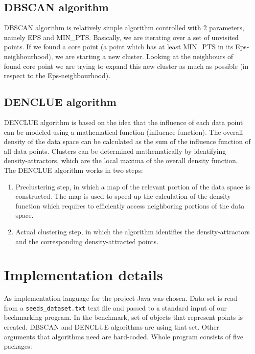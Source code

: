 \documentclass[12pt, a4paper, notitlepage, oneside]{article}
\begin{document}
\subsection{DBSCAN algorithm}

DBSCAN algorithm is relatively simple algorithm controlled with 2 parameters, namely EPS and MIN\_PTS. \cite{dbscan}
Basically, we are iterating over a set of unvisited points. If we found a core point (a point which has
at least MIN\_PTS in its Eps-neighbourhood), we are starting a new cluster. Looking at the neighbours 
of found core point we are trying to expand this new cluster as much as possible (in respect to the Eps-neighbourhood).

\subsection{DENCLUE algorithm}

DENCLUE algorithm is based on the idea that the influence of each data point can be modeled using a mathematical function (influence function). The overall density of the data space can be calculated as the sum of the influence function of all data points. Clusters can be determined mathematically by identifying density-attractors, which are the local maxima of the overall density function. The DENCLUE algorithm works in two steps:

\begin{enumerate}
	\item Preclustering step, in which a map of the relevant portion of the data space is constructed. The map is used to speed up the calculation of the density function which requires to efficiently access neighboring portions of the data space. 
	
	\item Actual clustering step, in which the algorithm identifies the density-attractors and the corresponding density-attracted points.
\end{enumerate}

\section{Implementation details}

As implementation language for the project Java was chosen.
Data set is read from a \texttt{seeds\_dataset.txt} text file and passed to a standard input of our bechmarking program.
In the benchmark, set of objects that represent points is created. 
DBSCAN and DENCLUE algorithms are using that set.
Other arguments that algorithms need are hard-coded. Whole program consists of five packages:
\end{document}
